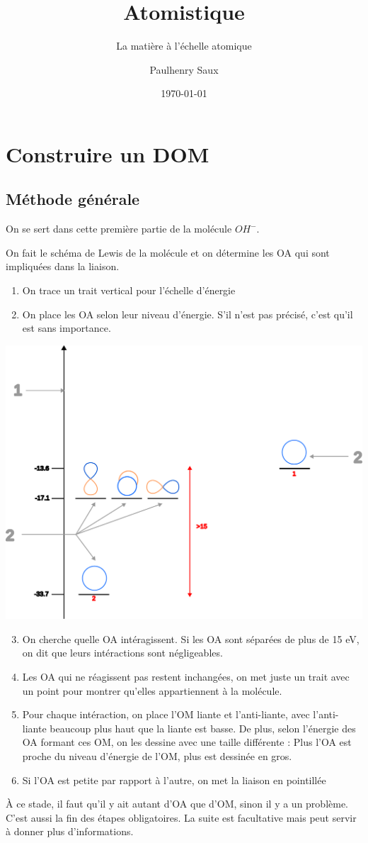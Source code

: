 \documentclass[french]{yLectureNote}
\title{Atomistique}
\subtitle{La matière à l'échelle atomique}
\author{Paulhenry Saux}
\date{\today}
\begin{document}
\setcounter{chapter}{4}
\chapter{Construire un DOM}
\section{Méthode générale}
On se sert dans cette première partie de la molécule $OH^-$.

On fait le schéma de Lewis de la molécule et on détermine les OA qui sont impliquées dans la liaison.
\begin{enumerate}
 \item On trace un trait vertical pour l'échelle d'énergie
 \item On place les OA selon leur niveau d'énergie. S'il n'est pas précisé, c'est qu'il est sans importance.
\end{enumerate}
\includegraphics[scale=0.5]{DOM1}
\begin{enumerate}
\setcounter{enumi}{2}
 \item On cherche quelle OA intéragissent. Si les OA sont séparées de plus de 15 eV, on dit que leurs intéractions sont négligeables.
 \item Les OA qui ne réagissent pas restent inchangées, on met juste un trait avec un point pour montrer qu'elles appartiennent à la molécule.
 \item Pour chaque intéraction, on place l'OM liante et l'anti-liante, avec l'anti-liante beaucoup plus haut que la liante est basse. De plus, selon l'énergie des OA formant ces OM, on les dessine avec une taille différente : Plus l'OA est proche du niveau d'énergie de l'OM, plus est dessinée en gros.
 \item Si l'OA est petite par rapport à l'autre, on met la liaison en pointillée
\end{enumerate}
À ce stade, il faut qu'il y ait autant d'OA que d'OM, sinon il y a un problème. C'est aussi la fin des étapes obligatoires. La suite est facultative mais peut servir à donner plus d'informations.
\end{document}
